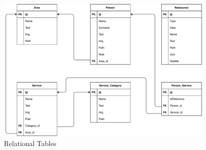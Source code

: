 \documentclass[12pt]{report}
\begin{document}
\begin{figure}[H]
	\centering
	\includegraphics[width=0.95\textwidth]{ER-Logic-Tables.pdf}
	\caption{Relational Tables}
\end{figure}

\clearpage
\listoffigures
\end{document}
